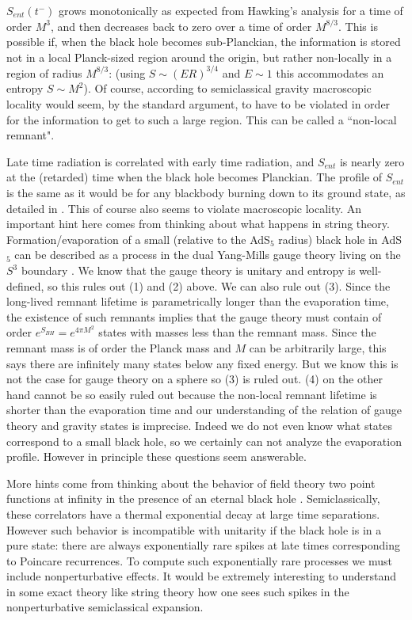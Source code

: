  $S_{ent}(t^-)$ grows monotonically as expected from Hawking's analysis for a time of order $M^3$, and then decreases back to zero over a time of order $M^{8/3}$. This is possible if, when the black hole becomes sub-Planckian, the information is stored not in a local Planck-sized region around the origin, but  rather non-locally in a region of radius  $M^{8/3}$: (using $S\sim (ER)^{3/4}$ and $E\sim 1$ this accommodates an entropy $S\sim M^2$). Of course, according to semiclassical gravity macroscopic locality would seem, by the standard argument,  to have to be violated in order for the information to get to such a large region. This can be called a ``non-local remnant". 

  Late time radiation is correlated with early time radiation, and $S_{ent}$ is nearly zero at the (retarded) time when the black hole becomes Planckian. The profile of $S_{ent}$ is the same as it would be for any blackbody burning down to its ground state, as detailed in \page. This of course also seems to violate macroscopic locality. 
An important hint here comes from thinking about what happens in string theory. Formation/evaporation of a  small (relative to the AdS$_5$ radius) black hole in AdS$_5$ can be described as a process in the dual Yang-Mills gauge theory living on the $S^3$ boundary . We know that the gauge theory is unitary and entropy is well-defined, so this rules out (1) and (2) above.  We can also rule out (3). Since the long-lived remnant lifetime is parametrically longer than the 
evaporation time, the existence of such remnants implies that the gauge theory must contain of order $e^{S_{BH}}=e^{4\pi M^2}$ states with masses less than the 
remnant mass. Since the remnant mass is of order the Planck mass and  $M$ can be arbitrarily large, this says there are infinitely many states below any fixed  energy. But we know this is not the case for gauge theory on a sphere so (3) is ruled out. 
(4) on the other hand cannot be so easily ruled out because the non-local remnant lifetime is shorter than the evaporation time and our understanding of the relation of gauge theory and gravity states is imprecise.  Indeed we do not even know what states correspond to a small black hole, so we certainly can not  analyze the evaporation profile.  However in principle these questions seem answerable.

More hints come from thinking about the behavior of field theory two point functions  at infinity in the presence of an eternal black hole \jmc.  Semiclassically, these correlators have a thermal exponential decay at large time separations. However such behavior is incompatible with unitarity  if the black hole is in a pure state: there are always exponentially  rare spikes at late times corresponding to Poincare recurrences.  To compute such exponentially rare processes we must include nonperturbative effects. It would be extremely interesting to understand in some exact theory like string theory how one sees such spikes in the nonperturbative semiclassical expansion.


